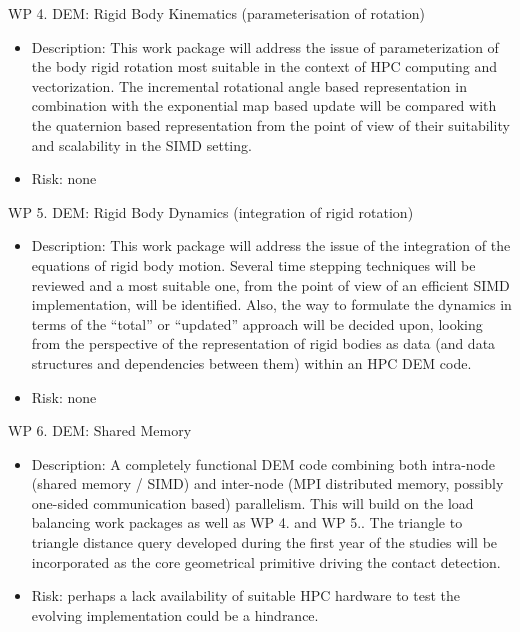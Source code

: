 \documentclass[times,12pt]{ACME2015article}
\begin{document}
WP 4. DEM: Rigid Body Kinematics (parameterisation of rotation)
\begin{itemize}
\item Description: This work package will address the issue of parameterization of the body rigid rotation most suitable in the context of HPC computing and vectorization. The incremental rotational angle based representation in combination with the exponential map based update will be compared with the quaternion based representation from the point of view of their suitability and scalability in the SIMD setting.
\item Risk: none
\end{itemize}

WP 5. DEM: Rigid Body Dynamics (integration of rigid rotation)
\begin{itemize}
\item Description: This work package will address the issue of the integration of the equations of rigid body motion. Several time stepping techniques will be reviewed and a most suitable one, from the point of view of an efficient SIMD implementation, will be identified. Also, the way to formulate the dynamics in terms of the “total” or “updated” approach will be decided upon, looking from the perspective of the representation of rigid bodies as data (and data structures and dependencies between them) within an HPC DEM code.
\item Risk: none
\end{itemize}

WP 6. DEM: Shared Memory
\begin{itemize}
\item Description: A completely functional DEM code combining both intra-node (shared memory / SIMD) and inter-node (MPI distributed memory, possibly one-sided communication based) parallelism. This will build on the load balancing work packages as well as WP 4. and WP 5.. The triangle to triangle distance query developed during the first year of the studies will be incorporated as the core geometrical primitive driving the contact detection.
\item Risk: perhaps a lack availability of suitable HPC hardware to test the evolving implementation could be a hindrance.
\end{itemize}
\end{document}
